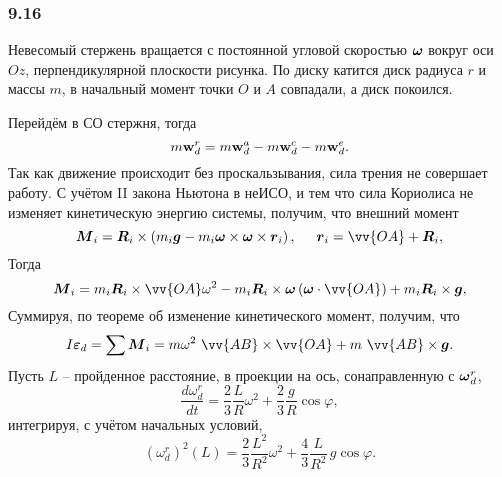 
\subsubsection*{9.16}

Невесомый стержень вращается с постоянной угловой скоростью $\mbox{\boldmath $\omega$}$ вокруг оси $Oz$, перпендикулярной плоскости рисунка. По диску катится диск радиуса $r$ и массы $m$, в начальный момент точки $O$ и $A$ совпадали, а диск покоился.

Перейдём в СО стержня, тогда 
\begin{equation}
    m\mbox{\boldmath $\mathrm{w}$}_d^r =
     m\mbox{\boldmath $\mathrm{w}$}_d^a - m\mbox{\boldmath $\mathrm{w}$}_d^c - m\mbox{\boldmath $\mathrm{w}$}_d^e.
\end{equation}
Так как движение происходит без проскальзывания, сила трения не совершает работу. С учётом II закона Ньютона в неИСО, и тем что сила Кориолиса не изменяет кинетическую энергию системы, получим, что внешний момент
\begin{equation}
    \vc{M}_i = \vc{R}_i \times \left(
        m_i \vc{g} 
        - 
        m_i \vc{\omega} \times \vc{\omega} \times \vc{r}_i
    \right),
    \hspace{0.5cm} 
    \vc{r}_i = \vv{OA} + \vc{R}_i,
\end{equation}
Тогда
$$
    \vc{M}_i =
    m_i \vc{R}_i \times \vv{OA} \omega^2 -
    m_i \vc{R}_i \times \vc{\omega} \left(\vc{\omega} \cdot \vv{OA}\right) + m_i \vc{R}_i \times \vc{g},
$$
Суммируя, по теореме об изменение кинетического момент, получим, что
$$
    I \vc{\varepsilon}_d = \sum \vc{M}_i = m \omega^2  \ \vv{AB} \times \vv{OA} + m \ \vv{AB} \times \vc{g}.
$$
Пусть $L$ -- пройденное расстояние, в проекции на ось, сонаправленную с $\mbox{\boldmath $\omega$}_d^r$,
$$
    \frac{d \omega_d^r}{dt} =
    \frac{2}{3} \frac{L}{R} \omega^2 + \frac{2}{3} \frac{g}{R} \cos \varphi,
$$
интегрируя, с учётом начальных условий,
\begin{equation}
    (\omega_d^{r})^2 (L) =
    \frac{2}{3} \frac{L^2}{R^2} \omega^2 + \frac{4}{3} \frac{L}{R^2} \, g \cos \varphi.
\end{equation}

